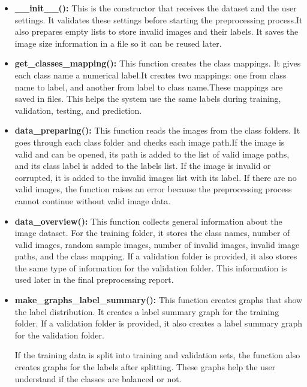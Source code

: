 \documentclass[12pt,a4paper]{report}
\begin{document}
\begin{itemize}
    \item \textbf{\_\_init\_\_():}
    This is the constructor that receives the dataset and the user settings. 
    It validates these settings before starting the preprocessing process.It also prepares empty lists to store invalid images and their labels.
    It saves the image size information in a file so it can be reused later.

    \item \textbf{get\_classes\_mapping():}
    This function creates the class mappings. It gives each class name a numerical label.It creates two mappings:
    one from class name to label, and another from label to class name.These mappings are saved in files. This helps the system use the same labels during
    training, validation, testing, and prediction.

    \item \textbf{data\_preparing():}
    This function reads the images from the class folders. It goes through each class
    folder and checks each image path.If the image is valid and can be opened, its path is added to the list of valid image
    paths, and its class label is added to the labels list. If the image is invalid or
    corrupted, it is added to the invalid images list with its label.
    If there are no valid images, the function raises an error because the preprocessing
    process cannot continue without valid image data.

    \item \textbf{data\_overview():}
    This function collects general information about the image dataset. For the training
    folder, it stores the class names, number of valid images, random sample images,
    number of invalid images, invalid image paths, and the class mapping.
    If a validation folder is provided, it also stores the same type of information for
    the validation folder. This information is used later in the final preprocessing
    report.

    \item \textbf{make\_graphs\_label\_summary():}
    This function creates graphs that show the label distribution. It creates a label
    summary graph for the training folder. If a validation folder is provided, it also
    creates a label summary graph for the validation folder.

    If the training data is split into training and validation sets, the function also
    creates graphs for the labels after splitting. These graphs help the user understand
    if the classes are balanced or not.


\end{itemize}
\end{document}
